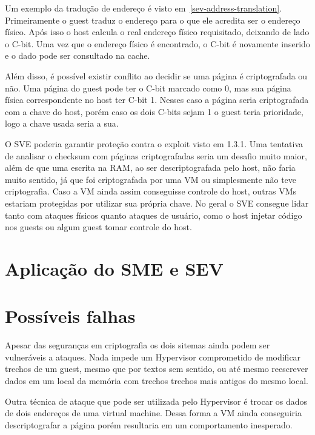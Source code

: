 \documentclass{report}
\begin{document}
Um exemplo da tradução de endereço é visto em~\ref{sev-address-translation}.
Primeiramente o guest traduz o endereço para o que ele acredita ser o endereço
físico. Após isso o host calcula o real endereço físico requisitado, deixando
de lado o C-bit. Uma vez que o endereço físico é encontrado, o C-bit é
novamente inserido e o dado pode ser consultado na cache.

Além disso, é possível existir conflito ao decidir se uma página é criptografada
ou não. Uma página do guest pode ter o C-bit marcado como 0, mas sua página
física correspondente no host ter C-bit 1. Nesses caso a página seria
criptografada com a chave do host, porém caso os dois C-bits sejam 1 o guest
teria prioridade, logo a chave usada seria a sua.

O SVE poderia garantir proteção contra o exploit visto em 1.3.1. Uma
tentativa de analisar o checksum com páginas criptografadas seria um desafio
muito maior, além de que uma escrita na RAM, ao ser descriptografada pelo host,
não faria muito sentido, já que foi criptografada por uma VM ou simplesmente
não teve criptografia. Caso a VM ainda assim conseguisse controle do host,
outras VMs estariam protegidas por utilizar sua própria chave. No geral o SVE
consegue lidar tanto com ataques físicos quanto ataques de usuário, como o host
injetar código nos guests ou algum guest tomar controle do host.

\section{Aplicação do SME e SEV}

\section{Possíveis falhas}

Apesar das seguranças em criptografia os dois sitemas ainda podem ser
vulneráveis a ataques. Nada impede um Hypervisor comprometido de modificar
trechos de um guest, mesmo que por textos sem sentido, ou até mesmo reescrever
dados em um local da memória com trechos trechos mais antigos do mesmo local.

Outra técnica de ataque que pode ser utilizada pelo Hypervisor é trocar os
dados de dois endereços de uma virtual machine. Dessa forma a VM ainda
conseguiria descriptografar a página porém resultaria em um comportamento
inesperado.




\nocite{*}

\end{document}
